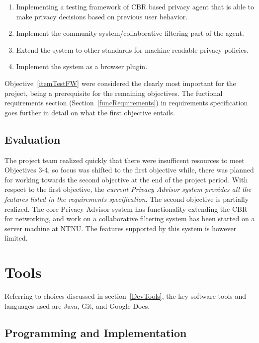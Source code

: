 \begin{enumerate}
\item\label{itemTestFW} Implementing a testing framework of CBR based privacy agent that is able to make privacy decisions based on previous user behavior.
\item\label{itemCollaborative} Implement the community system/collaborative filtering part of the agent.
\item\label{itemExtend} Extend the system to other standards for machine readable privacy policies.
\item\label{itemBrowser}Implement the system as a browser plugin. 
\end{enumerate}

Objective~\ref{itemTestFW} were considered the clearly most important for the project, being a prerequisite for the remaining objectives. The fuctional requirements section (Section~\ref{funcRequirements}) in requirements specification goes further in detail on what the first objective entails.

\subsection{Evaluation}
The project team realized quickly that there were insufficent resources to meet Objectives 3-4, so focus was shifted to the first objective while, there was planned for working towards the second objective at the end of the project period. With respect to the first objective, the \emph{current Privacy Advisor system provides all the features listed in the requirements specification}. The second objective is partially realized. The core Privacy Advisor system has functionality extending the CBR for networking, and work on a collaborative filtering system has been started on a server machine at NTNU. The features supported by this system is however limited.



\section{Tools}\label{toolseval}

Referring to choices discussed in section~\ref{DevTools}, the key
software tools and languages used are Java, Git, and Google
Docs. 

\subsection{Programming and Implementation}

